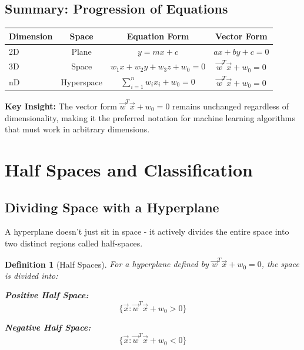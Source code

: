 \documentclass[12pt,a4paper]{article}
\theoremstyle{directpoint}
\newtheorem*{definition}{Definition}
\theoremstyle{definition}
\begin{document}
\subsection{Summary: Progression of Equations}

\begin{table}[h!]
\centering
\begin{tabular}{|l|c|c|c|}
\hline
\textbf{Dimension} & \textbf{Space} & \textbf{Equation Form} & \textbf{Vector Form} \\
\hline
2D & Plane & $y = mx + c$ & $ax + by + c = 0$ \\
\hline
3D & Space & $w_1x + w_2y + w_3z + w_0 = 0$ & $\vec{w}^T\vec{x} + w_0 = 0$ \\
\hline
nD & Hyperspace & $\sum_{i=1}^n w_ix_i + w_0 = 0$ & $\vec{w}^T\vec{x} + w_0 = 0$ \\
\hline
\end{tabular}
\end{table}

\textbf{Key Insight:} The vector form $\vec{w}^T\vec{x} + w_0 = 0$ remains unchanged regardless of dimensionality, making it the preferred notation for machine learning algorithms that must work in arbitrary dimensions.

\newpage

\section{Half Spaces and Classification}

\subsection{Dividing Space with a Hyperplane}

A hyperplane doesn't just sit in space - it actively divides the entire space into two distinct regions called half-spaces.

\begin{definition}[Half Spaces]
For a hyperplane defined by $\vec{w}^T\vec{x} + w_0 = 0$, the space is divided into:

\textbf{Positive Half Space:}
\begin{equation}
\{\vec{x} : \vec{w}^T\vec{x} + w_0 > 0\}
\end{equation}

\textbf{Negative Half Space:}
\begin{equation}
\{\vec{x} : \vec{w}^T\vec{x} + w_0 < 0\}
\end{equation}
\end{definition}
\end{document}
